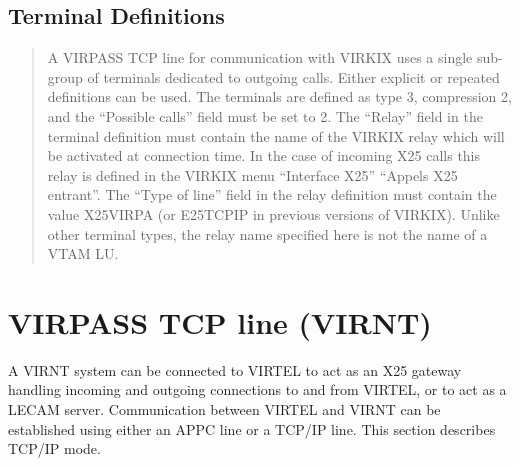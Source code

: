 \documentclass[letterpaper,10pt,english]{sphinxmanual}
\begin{document}
\subsection{Terminal Definitions}
\label{\detokenize{connectivity_guide:index-44}}\label{\detokenize{connectivity_guide:id17}}\begin{quote}

A VIRPASS TCP line for communication with VIRKIX uses a single sub-group of terminals dedicated to outgoing calls. Either explicit or repeated definitions can be used. The terminals are defined as type 3, compression 2, and the “Possible calls” field must be set to 2. The “Relay” field in the terminal definition must contain the name of the VIRKIX relay which will be activated at connection time. In the case of incoming X25 calls this relay is defined in the VIRKIX menu “Interface X25” \textendash{} “Appels X25 entrant”. The “Type of
line” field in the relay definition must contain the value X25VIRPA (or E25TCPIP in previous versions of VIRKIX). Unlike other terminal types, the relay name specified here is not the name of a VTAM LU.
\end{quote}


\newpage

\ignorespaces 

\section{VIRPASS TCP line (VIRNT)}
\label{\detokenize{connectivity_guide:virpass-tcp-line-virnt}}\label{\detokenize{connectivity_guide:index-45}}
A VIRNT system can be connected to VIRTEL to act as an X25 gateway handling incoming and outgoing connections to and from VIRTEL, or to act as a LECAM server. Communication between VIRTEL and VIRNT can be established using either an APPC line or a TCP/IP line. This section describes TCP/IP mode.


\ignorespaces 
\end{document}
